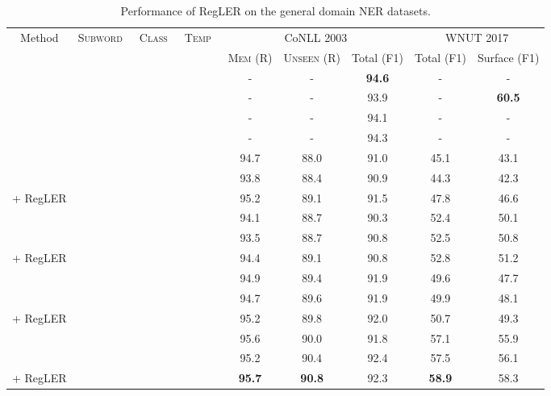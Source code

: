 \documentclass[11pt]{article}
\newcommand{\cmark}{\ding{51}}\newcommand{\xmark}{\ding{55}}\newcommand{\cross}{\ding{61}}\newcommand{\mb}[1]{\textcolor{red}{#1}}
\begin{document}
\begin{table*}[t]
\begin{adjustbox}{width=\textwidth}
\begin{tabular}{l c c c c c c | c c}
\toprule
 \multicolumn{1}{c}{\multirow{3}{*}{Method}} & \multicolumn{1}{c}{\multirow{3}{*}{\textsc{Subword}~}} &
\multicolumn{1}{c}{\multirow{3}{*}{\textsc{Class}~}} &
\multicolumn{1}{c}{\multirow{3}{*}{\textsc{Temp}~}} & \multicolumn{3}{c}{CoNLL 2003} & \multicolumn{2}{c}{WNUT 2017}      \\ \cmidrule{5-9} 
& & & & \textsc{Mem} (R) &  \textsc{Unseen} (R) &  Total (F1) & Total (F1) & Surface (F1) \\ \midrule
 \cross & \xmark & \xmark & \xmark & - & - & \textbf{94.6} & - & - \\
 \cross  & \xmark & \xmark & \xmark & - & - & 93.9 & - & \textbf{60.5} \\
 \cross  & \xmark & \xmark & \xmark & - & - & 94.1 & - & - \\
 \cross & \xmark & \xmark & \xmark & - & - & 94.3 & - & - \\
\midrule
 & \xmark & \xmark & \xmark & 94.7 & 88.0  & 91.0 & 45.1 & 43.1 \\
 & \xmark & \xmark & \xmark & 93.8 & 88.4  & 90.9 & 44.3 & 42.3 \\
 + RegLER & \cmark & \cmark & \cmark & 95.2 & 89.1  & 91.5 & 47.8 & 46.6 \\
\midrule
 & \xmark & \xmark & \xmark & 94.1 & 88.7 & 90.3 & 52.4 & 50.1 \\
 & \xmark & \xmark & \xmark & 93.5 & 88.7 & 90.8 & 52.5 & 50.8 \\
 + RegLER & \cmark & \cmark & \cmark & 94.4 & 89.1 & 90.8 & 52.8 & 51.2 \\
\midrule
 & \xmark & \xmark & \xmark & 94.9 & 89.4 & 91.9 & 49.6 & 47.7 \\
 & \xmark & \xmark & \xmark & 94.7 & 89.6 & 91.9 & 49.9 & 48.1 \\
 + RegLER & \cmark & \cmark & \cmark & 95.2 & 89.8 & 92.0 & 50.7 & 49.3 \\
\midrule
 & \xmark & \xmark & \xmark & 95.6 & 90.0 & 91.8 & 57.1 & 55.9 \\
 & \xmark & \xmark & \xmark & 95.2 & 90.4 & 92.4 & 57.5 & 56.1 \\
 + RegLER & \cmark & \cmark & \cmark & \textbf{95.7} & \textbf{90.8} & 92.3 & \textbf{58.9} & 58.3 \\
\bottomrule
\end{tabular}
\end{adjustbox}
\caption{Performance of RegLER on the general domain NER datasets.}
\label{tab:maintable 2}
\end{table*}
\end{document}
